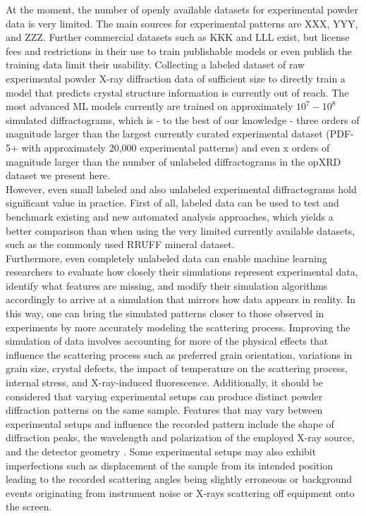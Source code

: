 At the moment, the number of openly available datasets for experimental powder data is very limited. The main sources for experimental patterns are XXX, YYY, and ZZZ. Further commercial datasets such as KKK and LLL exist, but license fees and restrictions in their use to train publishable models or even publish the training data limit their usability. Collecting a labeled dataset of raw experimental powder X-ray diffraction data of sufficient size to directly train a model that predicts crystal structure information is currently out of reach. The most advanced ML models currently are trained on approximately $10^7 - 10^8$ simulated diffractograms, which is - to the best of our knowledge - three orders of magnitude larger than the largest currently curated experimental dataset (PDF-5+ with approximately 20,000 experimental patterns) and even x orders of magnitude larger than the number of unlabeled diffractograms in the opXRD dataset we present here. \\

However, even small labeled and also unlabeled experimental diffractograms hold significant value in practice. First of all, labeled data can be used to test and benchmark existing and new automated analysis approaches, which yields a better comparison than when using the very limited currently available datasets, such as the commonly used RRUFF mineral dataset\cite{Armbruster2015}. \\

Furthermore, even completely unlabeled data can enable machine learning researchers to evaluate how closely their simulations represent experimental data, identify what features are missing, and modify their simulation algorithms accordingly to arrive at a simulation that mirrors how data appears in reality. In this way, one can bring the simulated patterns closer to those observed in experiments by more accurately modeling the scattering process.
Improving the simulation of data involves accounting for more of the physical effects that influence the scattering process such as preferred grain orientation, variations in grain size, crystal defects, the impact of temperature on the scattering process, internal stress, and X-ray-induced fluorescence\cite{cao2024simxrd, Waseda2011, Pecharsky2023}.  Additionally, it should be considered that varying experimental setups can produce distinct powder diffraction patterns on the same sample. Features that may vary between experimental setups and influence the recorded pattern include the shape of diffraction peaks, the wavelength and polarization of the employed X-ray source, and the detector geometry
\cite{Waseda2011, Pecharsky2023}. Some experimental setups may also exhibit imperfections such as displacement of the sample from its intended position leading to the recorded scattering angles being slightly erroneous \cite{hulbert2023} or background events originating from instrument noise or X-rays scattering off equipment onto the screen.\\

